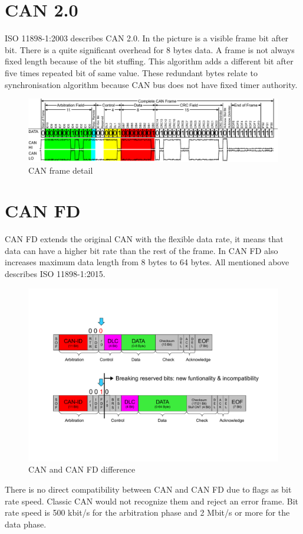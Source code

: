 \documentclass{ctuthesis}
\begin{document}
 \section{CAN 2.0}
  ISO 11898-1:2003 describes CAN 2.0. In the picture is a visible frame bit after bit. There is a quite significant overhead for 8 bytes data. A frame is not always fixed length because of the bit stuffing. This algorithm adds a different bit after five times repeated bit of same value. These redundant bytes relate to synchronisation algorithm because CAN bus does not have fixed timer authority.
  \begin{figure}[H]
  \includegraphics[width=1\textwidth]{CAN-Bus-frame_in_base_format_without_stuffbits}
  \caption{CAN frame detail \cite{can_frame}}
  \end{figure}

 \section{CAN FD}
  CAN FD extends the original CAN with the flexible data rate, it means that data can have a higher bit rate than the rest of the frame. In CAN FD also increases maximum data length from 8 bytes to 64 bytes. All mentioned above describes ISO 11898-1:2015.
  \begin{figure}[H]
  \includegraphics[width=1\textwidth]{agl2017-socketcan-can_fd}
  \caption{CAN and CAN FD difference \cite{canfd}}
  \end{figure}
  There is no direct compatibility between CAN and CAN FD due to flags as bit rate speed. Classic CAN would not recognize them and reject an error frame. Bit rate speed is 500 kbit/s for the arbitration phase and 2 Mbit/s or more for the data phase.
 
\end{document}
